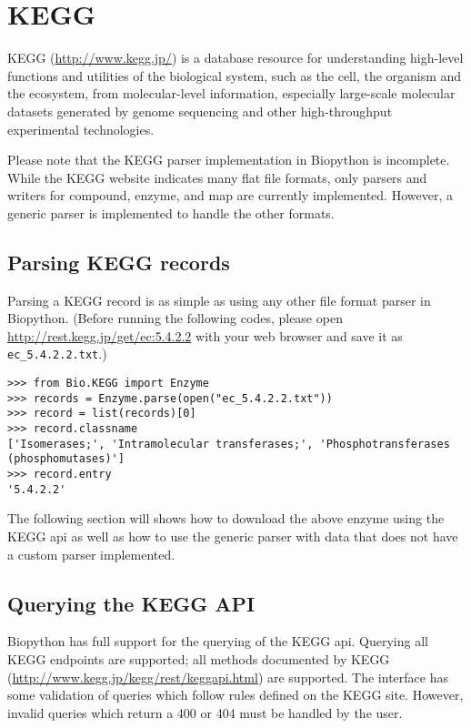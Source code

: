 \chapter{KEGG}
\label{chap:kegg}

KEGG (\url{http://www.kegg.jp/}) is a database resource for understanding high-level functions and utilities of the biological system, such as the cell, the organism and the ecosystem, from molecular-level information, especially large-scale molecular datasets generated by genome sequencing and other high-throughput experimental technologies.

Please note that the KEGG parser implementation in Biopython is incomplete. While the KEGG website indicates many flat file formats, only parsers and writers for compound, enzyme, and map are currently implemented. However, a generic parser is implemented to handle the other formats.

\section{Parsing KEGG records}
Parsing a KEGG record is as simple as using any other file format parser in Biopython. 
(Before running the following codes, please open \url{http://rest.kegg.jp/get/ec:5.4.2.2} with your web browser and save it as \verb|ec_5.4.2.2.txt|.)

\begin{verbatim}
>>> from Bio.KEGG import Enzyme
>>> records = Enzyme.parse(open("ec_5.4.2.2.txt"))
>>> record = list(records)[0]
>>> record.classname
['Isomerases;', 'Intramolecular transferases;', 'Phosphotransferases (phosphomutases)']
>>> record.entry
'5.4.2.2'
\end{verbatim}

The following section will shows how to download the above enzyme using the KEGG api as well as how to use the generic parser with data that does not have a custom parser implemented.

\section{Querying the KEGG API}

Biopython has full support for the querying of the KEGG api. Querying all KEGG endpoints are supported; all methods documented by KEGG (\url{http://www.kegg.jp/kegg/rest/keggapi.html}) are supported. The interface has some validation of queries which follow rules defined on the KEGG site. However, invalid queries which return a 400 or 404 must be handled by the user.

